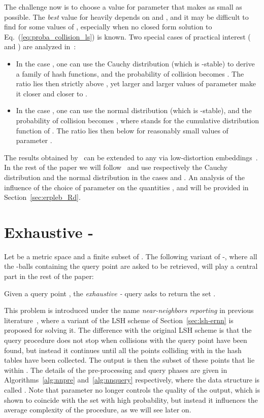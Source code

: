 The challenge now is to choose a value for parameter  that makes
 as small as
possible. The {\em best} value for  heavily depends on  and
, and it may be difficult to find for some values of ,
especially when no closed form solution to
Eq.~(\ref{eq:proba_collision_ls}) is known. Two special cases of
practical interest ( and ) are analyzed
in~\cite{DIIM04}:
\begin{itemize}
\item In the case , one can use the Cauchy distribution (which is
  -stable) to derive a family of hash functions, and the
  probability of collision becomes . The ratio  lies then strictly above , yet
  larger and larger values of parameter  make it closer and
  closer to .
\item In the case , one can use the normal distribution
   (which is -stable), and the probability of
  collision becomes , where
   stands for the cumulative
  distribution function of .  The ratio
   lies then below 
  for reasonably small values of parameter .
\end{itemize}
The results obtained by~\citet{DIIM04} can be extended to any
 via low-distortion embeddings~\cite{js-elpilo}.  In the
rest of the paper we will follow~\cite{DIIM04} and use respectively
the Cauchy distribution and the normal distribution in the cases 
and . An analysis of the influence of the choice of
parameter  on the quantities ,  and
 will be provided in
Section~\ref{sec:erpleb_Rd}.




\section{Exhaustive -\pleb}
\label{sec:all-re-nn}

Let  be a metric space and  a finite subset of . The
following variant of -\pleb, where all the -balls containing the
query point are asked to be retrieved, will play a central part in the
rest of the paper:
\begin{problem} \label{problem:allnnexact}
  Given a query point , the {\em exhaustive -\pleb} query
  asks to return the set .
\end{problem}
This problem is introduced under the name {\em near-neighbors
  reporting} in previous literature~\cite[Chapter~1]{SDI05}, where a
variant of the LSH scheme of Section~\ref{sec:lsh-ernn} is proposed
for solving it. The difference with the original LSH scheme is that
the query procedure does not stop when  collisions with the query
point  have been found, but instead it continues until all the
points colliding with  in the  hash tables have been
collected. The output is then the subset of these points that lie
within . The details of the pre-processing and query
phases are given in Algorithms~\ref{alg:nnpre} and~\ref{alg:nnquery}
respectively, where the data structure is called . Note
that parameter  no longer controls the quality of the output,
which is shown to coincide with the set  with high
probability, but instead it influences the average complexity of the
procedure, as we will see later on.


